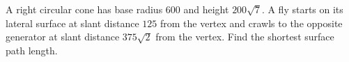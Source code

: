 A right circular cone has base radius $600$ and height $200\sqrt7$. A fly starts on its lateral surface at slant distance $125$ from the vertex and crawls to the opposite generator at slant distance $375\sqrt2$ from the vertex. Find the shortest surface path length.
